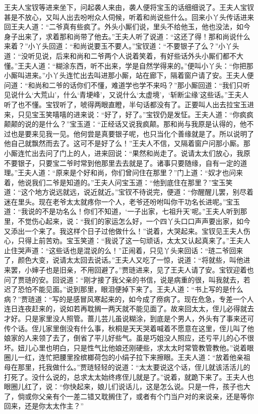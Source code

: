 \begin{parag}
    王夫人宝钗等进来坐下，问起袭人来由，袭人便将宝玉的话细细说了。王夫人宝钗甚是不放心，又叫人出去吩咐众人伺候，听着和尚说些什么。回来小丫头传话进来回王夫人道：“二爷真有些疯了。外头小厮们说，里头不给他玉，他也没法，如今身子出来了，求着那和尚带了他去。”王夫人听了说道：“这还了得！那和尚说什么来着？”小丫头回道：“和尚说要玉不要人。”宝钗道：“不要银子了么？”小丫头道：“没听见说，后来和尚和二爷两个人说着笑着，有好些话外头小厮们都不大懂。”王夫人道：“糊涂东西，听不出来，学是自然学得来的。”便叫小丫头：“你把那小厮叫进来。”小丫头连忙出去叫进那小厮，站在廊下，隔着窗户请了安。王夫人便问道：“和尚和二爷的话你们不懂，难道学也学不来吗？”那小厮回道：“我们只听见说什么‘大荒山’，什么‘青埂峰’，又说什么‘太虚境’，‘斩断尘缘’这些话。”王夫人听了也不懂。宝钗听了，唬得两眼直瞪，半句话都没有了。正要叫人出去拉宝玉进来，只见宝玉笑嘻嘻的进来说：“好了，好了。”宝钗仍是发怔。王夫人道：“你疯疯颠颠的说的是什么？”宝玉道：“正经话又说我疯颠。那和尚与我原是认得的，他不过也是要来见我一见。他何尝是真要银子呢，也只当化个善缘就是了。所以说明了他自己就飘然而去了。这可不是好了么！”王夫人不信，又隔着窗户问那小厮。那小厮连忙出去问了门上的人，进来回说：“果然和尚走了。说请太太们放心，我原不要银子，只要宝二爷时常到他那里去去就是了。诸事只要随缘，自有一定的道理。”王夫人道：“原来是个好和尚，你们曾问住在那里？”门上道：“奴才也问来着，他说我们二爷是知道的。”王夫人问宝玉道：“他到底住在那里？”宝玉笑道：“这个地方说远就远，说近就近。”宝钗不待说完，便道：“你醒醒儿罢，别尽着迷在里头。现在老爷太太就疼你一个人，老爷还吩咐叫你干功名长进呢。”宝玉道：“我说的不是功名么！你们不知道，‘一子出家，七祖升天’呢。”王夫人听到那里，不觉伤心起来，说：“我们的家运怎么好，一个四丫头口口声声要出家，如今又添出一个来了。我这样个日子过他做什么！”说着，大哭起来。宝钗见王夫人伤心，只得上前苦劝。宝玉笑道：“我说了这一句顽话，太太又认起真来了。”王夫人止住哭声道：“这些话也是混说的么！”正闹着，只见丫头来回话：“琏二爷回来了，颜色大变，说请太太回去说话。”王夫人又吃了一惊，说道：“将就些，叫他进来罢，小婶子也是旧亲，不用回避了。”贾琏进来，见了王夫人请了安。宝钗迎着也问了贾琏的安。回说道：“刚才接了我父亲的书信，说是病重的很，叫我就去，若迟了恐怕不能见面。”说到那里，眼泪便掉下来了。王夫人道：“书上写的是什么病？”贾琏道：“写的是感冒风寒起来的，如今成了痨病了。现在危急，专差一个人连日连夜赶来的，说如若再耽搁一两天就不能见面了。故来回太太，侄儿必得就去才好。只是家里没人照管。蔷儿芸儿虽说糊涂，到底是个男人，外头有了事来还可传个话。侄儿家里倒没有什么事，秋桐是天天哭着喊着不愿意在这里，侄儿叫了他娘家的人来领了去了，倒省了平儿好些气。虽是巧姐没人照应，还亏平儿的心不很坏。妞儿心里也明白，只是性气比他娘还刚硬些，求太太时常管教管教他。”说着眼圈儿一红，连忙把腰里拴槟榔荷包的小绢子拉下来擦眼。王夫人道：“放着他亲祖母在那里，托我做什么。”贾琏轻轻的说道：“太太要说这个话，侄儿就该活活儿的打死了。没什么说的，总求太太始终疼侄儿就是了。”说着，就跪下来了。王夫人也眼圈儿红了，说：“你快起来，娘儿们说话儿，这是怎么说。只是一件，孩子也大了，倘或你父亲有个一差二错又耽搁住了，或者有个门当户对的来说亲，还是等你回来，还是你太太作主？”
\end{parag}
